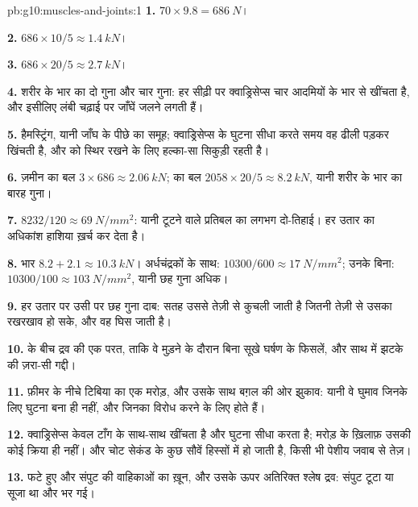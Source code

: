 \begin{solution}{pb:g10:muscles-and-joints:1}
\textbf{1.} $70 \times 9.8 = \qty{686}{N}$।

\textbf{2.} $686 \times 10/5 \approx \qty{1.4}{kN}$।

\textbf{3.} $686 \times 20/5 \approx \qty{2.7}{kN}$।

\textbf{4.} शरीर के भार का दो गुना और चार गुना: हर सीढ़ी पर क्वाड्रिसेप्स
चार आदमियों के भार से खींचता है, और इसीलिए लंबी चढ़ाई पर जाँघें जलने
लगती हैं।

\textbf{5.} हैमस्ट्रिंग, यानी जाँघ के पीछे का समूह; क्वाड्रिसेप्स के
घुटना सीधा करते समय वह ढीली पड़कर खिंचती है, और  को स्थिर रखने के लिए
हल्का-सा सिकुड़ी रहती है।

\textbf{6.} ज़मीन का बल $3 \times 686 \approx \qty{2.06}{kN}$;  का
बल $2058 \times 20/5 \approx \qty{8.2}{kN}$, यानी शरीर के भार का बारह
गुना।

\textbf{7.} $8232/120 \approx \qty{69}{N/mm^2}$: यानी टूटने वाले प्रतिबल
का लगभग दो-तिहाई। हर उतार  का अधिकांश हाशिया ख़र्च कर देता है।

\textbf{8.} भार $8.2 + 2.1 \approx \qty{10.3}{kN}$। अर्धचंद्रकों के साथ:
$10300/600 \approx \qty{17}{N/mm^2}$; उनके बिना: $10300/100 \approx
\qty{103}{N/mm^2}$, यानी छह गुना अधिक।

\textbf{9.} हर उतार पर उसी  पर छह गुना दाब: सतह उससे तेज़ी से
कुचली जाती है जितनी तेज़ी से उसका रखरखाव हो सके, और वह घिस जाती है।

\textbf{10.}  के बीच द्रव की एक परत, ताकि वे मुड़ने के दौरान
बिना सूखे घर्षण के फिसलें, और साथ में झटके की ज़रा-सी गद्दी।

\textbf{11.} फ़ीमर के नीचे टिबिया का एक मरोड़, और उसके साथ बग़ल की ओर
झुकाव: यानी वे घुमाव जिनके लिए घुटना बना ही नहीं, और जिनका विरोध करने के
लिए  होते हैं।

\textbf{12.} क्वाड्रिसेप्स केवल टाँग के साथ-साथ खींचता है और घुटना सीधा
करता है; मरोड़ के ख़िलाफ़ उसकी कोई क्रिया ही नहीं। और चोट सेकंड के कुछ
सौवें हिस्सों में हो जाती है, किसी भी पेशीय जवाब से तेज़।

\textbf{13.} फटे हुए  और संपुट की वाहिकाओं का ख़ून, और उसके ऊपर
अतिरिक्त श्लेष द्रव: संपुट टूटा या सूजा था और  भर गई।


\end{solution}
